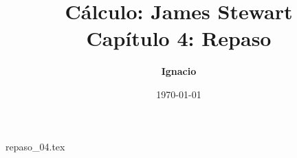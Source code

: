 \documentclass[11pt,spanish,oneside]{report}
\title{\textbf{Cálculo: James Stewart} \\ \Large Capítulo 4: Repaso}
\author{\textbf{Ignacio}}
\date{\today}
\begin{document}
\maketitle

{repaso_04.tex}
\end{document}
